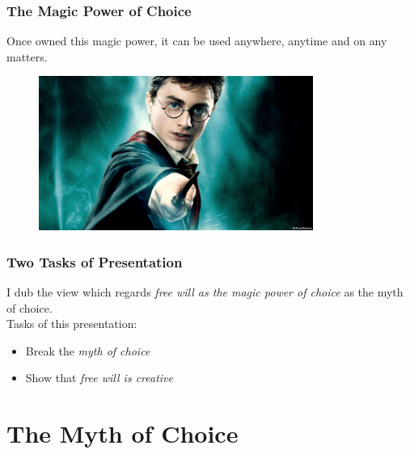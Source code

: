 \documentclass[xcolor=dvipsnames]{beamer}
\theoremstyle{definition}
\begin{document}
\begin{frame}[fragile]
  \frametitle{The Magic Power of Choice}
  Once owned this magic power, it can be used \alert{anywhere}, \alert{anytime} and on \alert{any matters}.
  \begin{figure}
    \centering
    \includegraphics[width=0.8\textwidth]{images/magic.jpg}\\
  \end{figure}
\end{frame}

\begin{frame}[fragile]
  \frametitle{Two Tasks of Presentation}
  I dub the view which regards \emph{free will as the magic power of choice} as the \alert{myth of choice}.\\[1cm]

  Tasks of this presentation:
  \begin{itemize}
  \item Break the \emph{myth of choice}
  \item Show that \emph{free will is creative}
  \end{itemize}
\end{frame}

\section{The Myth of Choice} %
\end{document}
